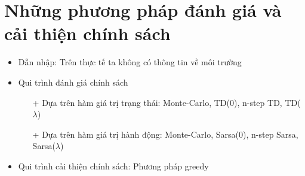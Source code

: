 	
\section{Những phương pháp đánh giá và cải thiện chính sách}
	\begin{itemize}
		\item Dẫn nhập: Trên thực tế ta không có thông tin về môi trường
		\item Qui trình đánh giá chính sách
			\begin{itemize}
				\item[+] Dựa trên hàm giá trị trạng thái: Monte-Carlo, TD(0), n-step TD, TD($\lambda$)
				\item[+] Dựa trên hàm giá trị hành động: Monte-Carlo, Sarsa(0), n-step Sarsa, Sarsa($\lambda$)
			\end{itemize}
		\item Qui trình cải thiện chính sách: Phương pháp greedy
	\end{itemize}
	
